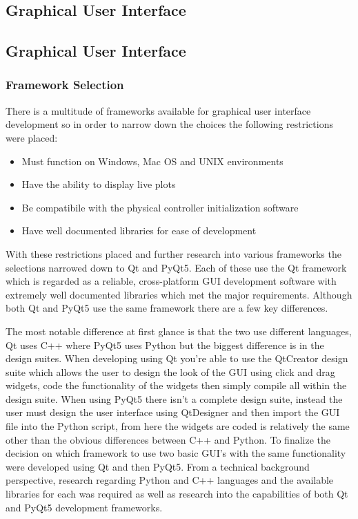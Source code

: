 \subsection{Graphical User Interface}
\subsection{Graphical User Interface}
\subsubsection{Framework Selection}

There is a multitude of frameworks available for graphical user interface development so in order to narrow down the choices the following restrictions were placed: 
\begin{itemize}
	\item Must function on Windows, Mac OS and UNIX environments
	\item Have the ability to display live plots
	\item Be compatibile with the physical controller initialization software
	\item Have well documented libraries for ease of development 
\end{itemize}
With these restrictions placed and further research into various frameworks the selections narrowed down to Qt and PyQt5. Each of these use the Qt framework which is regarded as a reliable, cross-platform GUI development software with extremely well documented libraries which met the major requirements. Although both Qt and PyQt5 use the same framework there are a few key differences. 

The most notable difference at first glance is that the two use different languages, Qt uses C++ where PyQt5 uses Python but the biggest difference is in the design suites. When developing using Qt you're able to use the QtCreator design suite which allows the user to design the look of the GUI using click and drag widgets, code the functionality of the widgets then simply compile all within the design suite. When using PyQt5 there isn't a complete design suite, instead the user must design the user interface using QtDesigner and then import the GUI file into the Python script, from here the widgets are coded is relatively the same other than the obvious differences between C++ and Python. To finalize the decision on which framework to use two basic GUI's with the same functionality were developed using Qt and then PyQt5. From a technical background perspective, research regarding Python and C++ languages and the available libraries for each was required as well as research into the capabilities of both Qt and PyQt5 development frameworks. 

